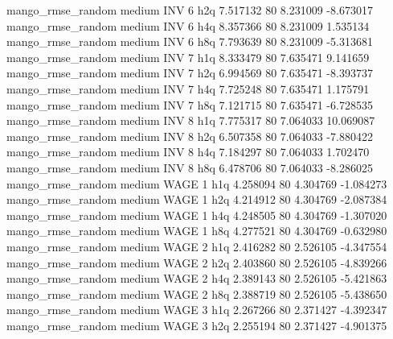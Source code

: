 mango_rmse_random     medium      INV                 6                  h2q  7.517132 80       8.231009          -8.673017
mango_rmse_random     medium      INV                 6                  h4q  8.357366 80       8.231009           1.535134
mango_rmse_random     medium      INV                 6                  h8q  7.793639 80       8.231009          -5.313681
mango_rmse_random     medium      INV                 7                  h1q  8.333479 80       7.635471           9.141659
mango_rmse_random     medium      INV                 7                  h2q  6.994569 80       7.635471          -8.393737
mango_rmse_random     medium      INV                 7                  h4q  7.725248 80       7.635471           1.175791
mango_rmse_random     medium      INV                 7                  h8q  7.121715 80       7.635471          -6.728535
mango_rmse_random     medium      INV                 8                  h1q  7.775317 80       7.064033          10.069087
mango_rmse_random     medium      INV                 8                  h2q  6.507358 80       7.064033          -7.880422
mango_rmse_random     medium      INV                 8                  h4q  7.184297 80       7.064033           1.702470
mango_rmse_random     medium      INV                 8                  h8q  6.478706 80       7.064033          -8.286025
mango_rmse_random     medium     WAGE                 1                  h1q  4.258094 80       4.304769          -1.084273
mango_rmse_random     medium     WAGE                 1                  h2q  4.214912 80       4.304769          -2.087384
mango_rmse_random     medium     WAGE                 1                  h4q  4.248505 80       4.304769          -1.307020
mango_rmse_random     medium     WAGE                 1                  h8q  4.277521 80       4.304769          -0.632980
mango_rmse_random     medium     WAGE                 2                  h1q  2.416282 80       2.526105          -4.347554
mango_rmse_random     medium     WAGE                 2                  h2q  2.403860 80       2.526105          -4.839266
mango_rmse_random     medium     WAGE                 2                  h4q  2.389143 80       2.526105          -5.421863
mango_rmse_random     medium     WAGE                 2                  h8q  2.388719 80       2.526105          -5.438650
mango_rmse_random     medium     WAGE                 3                  h1q  2.267266 80       2.371427          -4.392347
mango_rmse_random     medium     WAGE                 3                  h2q  2.255194 80       2.371427          -4.901375
